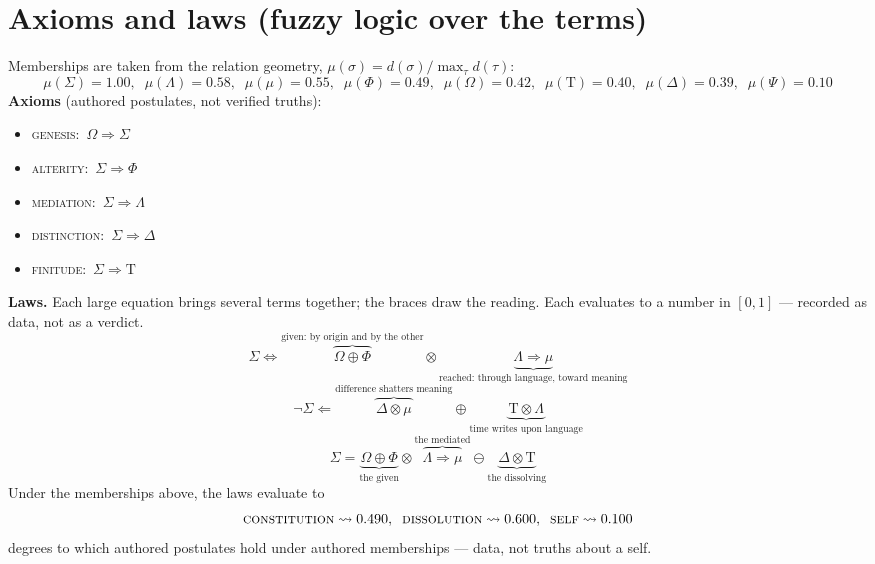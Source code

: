 \documentclass[11pt]{article}
\newcommand{\Tau}{\mathrm{T}}
\begin{document}
\section*{Axioms and laws (fuzzy logic over the terms)}
Memberships are taken from the relation geometry, $\mu(\sigma)=d(\sigma)/\max_\tau d(\tau)$:\begin{equation*}\mu(\Sigma){=}1.00,\;\; \mu(\Lambda){=}0.58,\;\; \mu(\mu){=}0.55,\;\; \mu(\Phi){=}0.49,\;\; \mu(\Omega){=}0.42,\;\; \mu(\Tau){=}0.40,\;\; \mu(\Delta){=}0.39,\;\; \mu(\Psi){=}0.10\end{equation*}
\noindent\textbf{Axioms} (authored postulates, not verified truths):\begin{itemize}\item \textsc{genesis}: $\,\Omega \Rightarrow \Sigma\,$\item \textsc{alterity}: $\,\Sigma \Rightarrow \Phi\,$\item \textsc{mediation}: $\,\Sigma \Rightarrow \Lambda\,$\item \textsc{distinction}: $\,\Sigma \Rightarrow \Delta\,$\item \textsc{finitude}: $\,\Sigma \Rightarrow \Tau\,$\end{itemize}
\noindent\textbf{Laws.} Each large equation brings several terms together; the braces draw the reading. Each evaluates to a number in $[0,1]$ --- recorded as data, not as a verdict.
\begin{equation*}\Sigma \Longleftrightarrow \overbrace{\Omega \oplus \Phi}^{\text{given: by origin and by the other}} \otimes \underbrace{\Lambda \Rightarrow \mu}_{\text{reached: through language, toward meaning}}\end{equation*}
\begin{equation*}\neg \Sigma \Longleftarrow \overbrace{\Delta \otimes \mu}^{\text{difference shatters meaning}} \oplus \underbrace{\Tau \otimes \Lambda}_{\text{time writes upon language}}\end{equation*}
\begin{equation*}\Sigma = \underbrace{\Omega \oplus \Phi}_{\text{the given}} \otimes \overbrace{\Lambda \Rightarrow \mu}^{\text{the mediated}} \ominus \underbrace{\Delta \otimes \Tau}_{\text{the dissolving}}\end{equation*}
Under the memberships above, the laws evaluate to\begin{equation*}\textsc{constitution}\rightsquigarrow 0.490,\;\; \textsc{dissolution}\rightsquigarrow 0.600,\;\; \textsc{self}\rightsquigarrow 0.100\end{equation*}\noindent degrees to which authored postulates hold under authored memberships --- data, not truths about a self.
\end{document}
